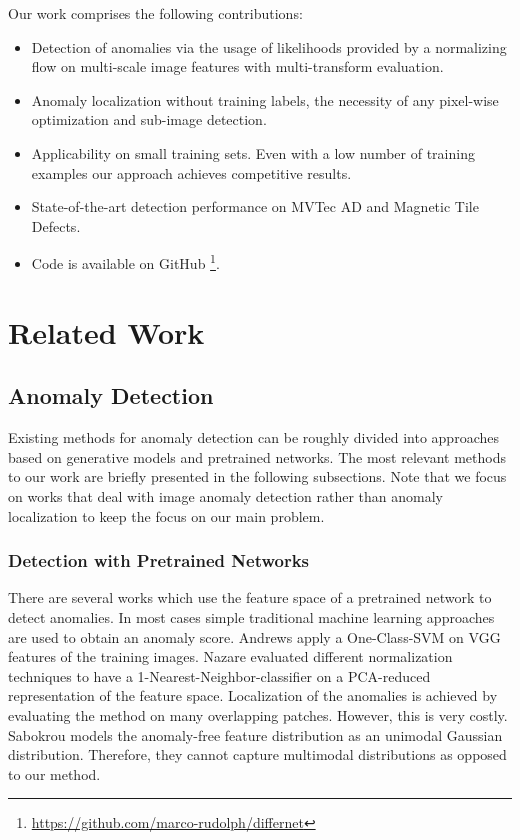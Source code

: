 \documentclass[10pt,twocolumn,letterpaper]{article}
\begin{document}
Our work comprises the following contributions:
\begin{itemize}
\item Detection of anomalies via the usage of likelihoods provided by a normalizing flow on multi-scale image features with multi-transform evaluation.
\item Anomaly localization without training labels, the necessity of any pixel-wise optimization and sub-image detection.
    \item Applicability on small training sets. Even with a low number of training examples our approach achieves competitive results.
    \item State-of-the-art detection performance on MVTec AD and Magnetic Tile Defects. 
    \item Code is available on GitHub \footnote{\url{https://github.com/marco-rudolph/differnet}}.\end{itemize}


\section{Related Work}
\label{related}
\subsection{Anomaly Detection}
Existing methods for anomaly detection can be roughly divided into approaches based on generative models and pretrained networks.
The most relevant methods to our work are briefly presented in the following subsections.
Note that we focus on works that deal with image anomaly detection rather than anomaly localization to keep the focus on our main problem.

\subsubsection{Detection with Pretrained Networks}
There are several works which use the feature space of a pretrained network to detect anomalies.
In most cases simple traditional machine learning approaches are used to obtain an anomaly score.
Andrews \etal \cite{andrews} apply a One-Class-SVM on VGG \cite{VGG} features of the training images.
Nazare \etal \cite{nazare} evaluated different normalization techniques to have a 1-Nearest-Neighbor-classifier on a PCA-reduced representation of the feature space.
Localization of the anomalies is achieved by evaluating the method on many overlapping patches. However, this is very costly.
Sabokrou \etal \cite{sabokrou} models the anomaly-free feature distribution as an unimodal Gaussian distribution. Therefore, they cannot capture multimodal distributions as opposed to our method.
\end{document}

